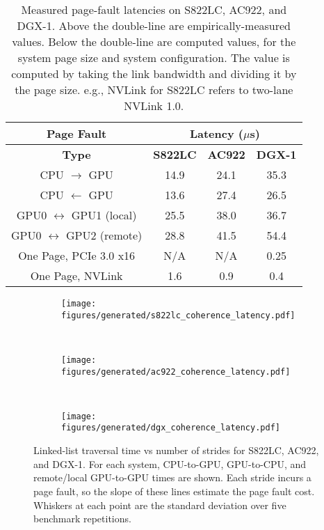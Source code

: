 \begin{table}[ht]
	\centering
	\caption[Page Fault Latencies]{
        Measured page-fault latencies on S822LC, AC922, and DGX-1.
        Above the double-line are empirically-measured values.
        Below the double-line are computed values, for the system page size and system configuration.
        The value is computed by taking the link bandwidth and dividing it by the page size.
        e.g., NVLink for S822LC refers to two-lane NVLink 1.0.
    }
	\label{tab:page-fault-latency}
	\begin{tabular}{cccc}
        \hline
        \textbf{Page Fault}                  & \multicolumn{3}{c|}{\textbf{Latency ($\mu$s)}}    \\ \hline
		\textbf{Type}                        & \textbf{S822LC} & \textbf{AC922} & \textbf{DGX-1} \\ \hline
		CPU  $\rightarrow$ GPU               & 14.9            & 24.1           & 35.3           \\ \hline
		CPU  $\leftarrow$  GPU               & 13.6            & 27.4           & 26.5           \\ \hline
		GPU0 $\leftrightarrow$ GPU1 (local)  & 25.5            & 38.0           & 36.7           \\ \hline
        GPU0 $\leftrightarrow$ GPU2 (remote) & 28.8            & 41.5           & 54.4           \\ \hline
        \hline
        One Page, PCIe 3.0 x16               & N/A             & N/A            & 0.25           \\ \hline
        One Page, NVLink                     & 1.6             & 0.9            & 0.4            \\ \hline
	\end{tabular}
\end{table}


\begin{figure}[ht]
	\centering
	\begin{subfigure}[b]{0.31\textwidth}
		\texttt{[image: figures/generated/s822lc\_coherence\_latency.pdf]}
		\caption{}
		\label{fig:s822lc-page-fault}
	\end{subfigure}
	~
	\begin{subfigure}[b]{0.31\textwidth}
		\texttt{[image: figures/generated/ac922\_coherence\_latency.pdf]}
		\caption{}
		\label{fig:ac922-page-fault}
	\end{subfigure}
	~
	\begin{subfigure}[b]{0.31\textwidth}
		\texttt{[image: figures/generated/dgx\_coherence\_latency.pdf]}
		\caption{}
		\label{fig:dgx-page-fault}
	\end{subfigure}
	\caption[Page Fault Latencies for S822LC, AC922, and DGX-1]{
        Linked-list traversal time vs number of strides for S822LC, AC922, and DGX-1.
        For each system, CPU-to-GPU, GPU-to-CPU, and remote/local GPU-to-GPU times are shown.
        Each stride incurs a page fault, so the slope of these lines estimate the page fault cost.
		Whiskers at each point are the standard deviation over five benchmark repetitions.
    }
	\label{fig:coherence-page-fault-latency}
\end{figure}


